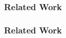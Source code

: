 \documentclass[10pt, pdf, xcolor=pdftex, dvipsnames, table]{beamer}
\begin{document}
\begin{frame}
	\tableofcontents[currentsection]
\end{frame}

\begin{frame}
	\frametitle{Related Work}
\end{frame}

\begin{frame}
	\frametitle{Related Work}
\end{frame}
\end{document}
